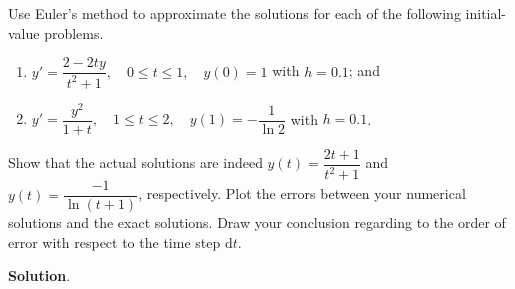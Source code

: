 \documentclass[11pt]{article}
\theoremstyle{break}
\newcommand{\dd}{\text{d}}
\numberwithin{equation}{theorem}
\begin{document}
\newpage
\begin{problem}\label{problem 3} %
    Use Euler's method to approximate the solutions for each of the following initial-value problems.
    \begin{enumerate}
        \item $y'=\dfrac{2-2ty}{t^2+1}, \quad 0\leq t\leq 1, \quad y(0)=1$ with $h=0.1$; and
        \item $y'=\dfrac{y^2}{1+t}, \quad 1\leq t\leq 2, \quad y(1)=-\dfrac{1}{\ln 2}$ with $h=0.1$.
    \end{enumerate}
    Show that the actual solutions are indeed $y(t)=\dfrac{2t+1}{t^2+1}$ and $y(t)=\dfrac{-1}{\ln(t+1)}$, respectively. Plot the errors between your numerical solutions and the exact solutions. Draw your conclusion regarding to the order of error with respect to the time step $\dd t$.
\end{problem}
\textbf{Solution}. 
\end{document}

